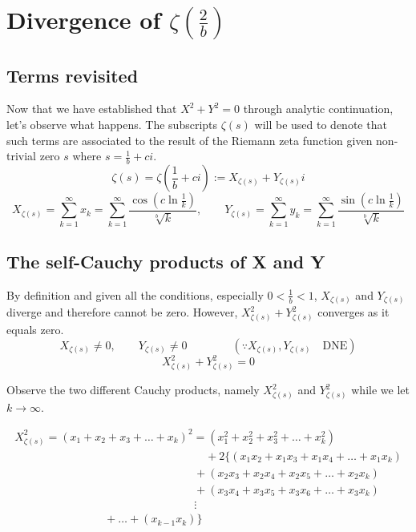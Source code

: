 \documentclass{amsart}
\begin{document}
	
	
	\section{Divergence of $\zeta(\frac{2}{b})$}
	\subsection{Terms revisited}
	Now that we have established that $X^2+Y^2 = 0$ through analytic continuation, let's observe what happens. The subscripts $\zeta(s)$ will be used to denote that such terms are associated to the result of the Riemann zeta function given non-trivial zero $s$ where $s=\frac{1}{b}+ci$.
	\[ \zeta(s) = \zeta(\frac{1}{b}+ci) := X_{\zeta(s)} + Y_{\zeta(s)}i \]
	\[ X_{\zeta(s)} = \sum\limits_{k=1}^{\infty}x_k = \sum\limits_{k=1}^{\infty}\frac{\cos({c\ln \frac{1}{k}})}{\sqrt[b]{k}}, \qquad Y_{\zeta(s)} = \sum\limits_{k=1}^{\infty}y_k = \sum\limits_{k=1}^{\infty}\frac{\sin({c\ln \frac{1}{k}})}{\sqrt[b]{k}} \]
	
	\subsection{The self-Cauchy products of X and Y}
	By definition and given all the conditions, especially $0 < \frac{1}{b} < 1$, $X_{\zeta(s)}$ and $Y_{\zeta(s)}$ diverge and therefore cannot be zero. However, $X_{\zeta(s)}^2+Y_{\zeta(s)}^2$ converges as it equals zero.
	\[ X_{\zeta(s)} \neq 0, \qquad Y_{\zeta(s)} \neq 0 \qquad\qquad ( \because X_{\zeta(s)}, Y_{\zeta(s)} \quad \text{DNE} ) \]
	\[ X_{\zeta(s)}^2+Y_{\zeta(s)}^2 = 0 \]
	
	Observe the two different Cauchy products, namely $X_{\zeta(s)}^2$ and $Y_{\zeta(s)}^2$ while we let $k \to \infty$.
	
	
	\[ \begin{array}{c}
		X_{\zeta(s)}^2 = (x_1 {+} x_2 {+} x_3 {+} \dots {+} x_k)^2 = (x_1^2 {+} x_2^2 {+} x_3^2 {+} \dots {+} x_k^2) \\
		\qquad\qquad\qquad\qquad\qquad\qquad\qquad\qquad\quad {+} 2\{(x_1x_2 {+} x_1x_3 {+} x_1x_4 {+} \dots {+} x_{1}x_{k}) \\ 
		\qquad\qquad\qquad\qquad\qquad\qquad\qquad\qquad {+} (x_2x_3 {+} x_2x_4 {+} x_2x_5 {+} \dots {+} x_2x_{k}) \\ 
		\qquad\qquad\qquad\qquad\qquad\qquad\qquad\qquad {+} (x_3x_4 {+} x_3x_5 {+} x_3x_6 {+} \dots {+} x_3x_{k}) \\ 
		\qquad\qquad\qquad\qquad\qquad\qquad\qquad\qquad \vdots \\
		\qquad\qquad\qquad\qquad {+} \dots {+} (x_{k-1}x_{k}) \} \\ 
	\end{array} \]
	\[\]
	
\end{document}
